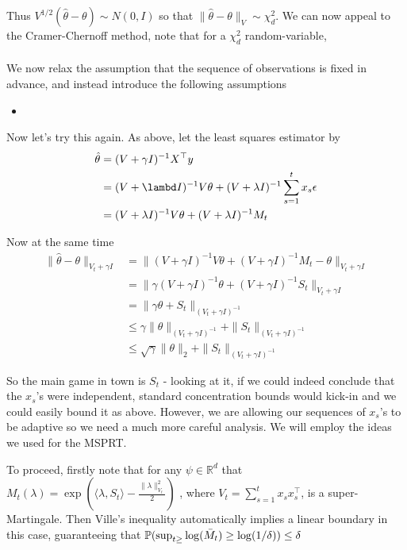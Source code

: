 Thus $V^{1/2}(\hat{\theta} - \theta) \sim N(0, I)$ so that $\|\hat{\theta} - \theta\|_{V} \sim \chi^2_d$. We can now appeal to the Cramer-Chernoff method, note that for a $\chi^2_d$ random-variable, 
\begin{align*}
    
\end{align*}

We now relax the assumption that the sequence of observations is fixed in advance, and instead introduce the following assumptions
\begin{itemize}
    \item 
\end{itemize}

Now let's try this again. As above, let the least squares estimator by 
\begin{align*}
\hat{\theta} 
&= (V + \gamma I)^{-1} X^{\top}y  \\
&= (V + \lambd I)^{-1} V\theta +  (V + \lambda I)^{-1} \sum_{s=1}^t x_s\epsilon\\
&= (V + \lambda I)^{-1} V\theta +  (V + \lambda I)^{-1}M_t
\end{align*}

Now at the same time
\begin{align*}
\|\hat{\theta} - \theta\|_{V_t + \gamma I}
&= \|(V + \gamma I)^{-1} V\theta +  (V + \gamma I)^{-1}M_t - \theta\|_{V_t + \gamma I}\\
&= \|\gamma (V + \gamma I)^{-1} \theta +  (V + \gamma I)^{-1}S_t \|_{V_t + \gamma I}\\
&= \|\gamma \theta +  S_t \|_{(V_t + \gamma I)^{-1}}\\
&\leq \gamma\|\theta\|_{(V_t + \gamma I)^{-1}} + \|S_t\|_{(V_t + \gamma I)^{-1}}\\
&\leq \sqrt{\gamma}\|\theta\|_{2} + \|S_t\|_{(V_t + \gamma I)^{-1}}
\end{align*}

So the main game in town is $S_t$ - looking at it, if we could indeed conclude that the $x_s$'s were independent, standard concentration bounds would kick-in and we could easily bound it as above. However, we are allowing our sequences of $x_s$'s to be adaptive so we need a much more careful analysis. We will employ the ideas we used for the MSPRT.

To proceed, firstly note that for any $\psi\in \mathbb{R}^d$ that $M_t(\lambda) = \exp\left( \langle \lambda, S_t\rangle - \frac{\|\lambda\|_{V_t}^2}{2} \right)$ , 
where $V_t = \sum_{s=1}^t x_s x_s^{\top}$, is a super-Martingale. Then Ville's inequality automatically implies a linear boundary in this case, guaranteeing that $\P(\sup_{t\geq }\log(\bar{M}_t) \geq \log(1/\delta)) \leq \delta$

